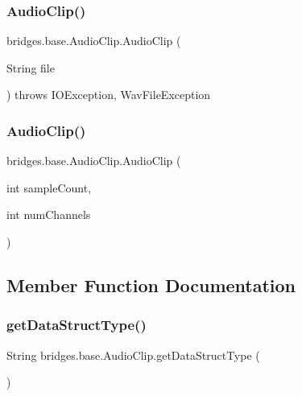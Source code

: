 \subsubsection{\texorpdfstring{Audio\+Clip()}{AudioClip()}\hspace{0.1cm}{\footnotesize\ttfamily [3/4]}}
{\footnotesize\ttfamily bridges.\+base.\+Audio\+Clip.\+Audio\+Clip (\begin{DoxyParamCaption}\item[{String}]{file }\end{DoxyParamCaption}) throws I\+O\+Exception, Wav\+File\+Exception}

\mbox{\label{classbridges_1_1base_1_1_audio_clip_aca2a5258c29b104bf8216ae5ec3c5938}} 
\subsubsection{\texorpdfstring{Audio\+Clip()}{AudioClip()}\hspace{0.1cm}{\footnotesize\ttfamily [4/4]}}
{\footnotesize\ttfamily bridges.\+base.\+Audio\+Clip.\+Audio\+Clip (\begin{DoxyParamCaption}\item[{int}]{sample\+Count,  }\item[{int}]{num\+Channels }\end{DoxyParamCaption})}



\subsection{Member Function Documentation}
\mbox{\label{classbridges_1_1base_1_1_audio_clip_ad1941b14198946a14d218d7be47f94b5}} 
\subsubsection{\texorpdfstring{get\+Data\+Struct\+Type()}{getDataStructType()}}
{\footnotesize\ttfamily String bridges.\+base.\+Audio\+Clip.\+get\+Data\+Struct\+Type (\begin{DoxyParamCaption}{ }\end{DoxyParamCaption})}

